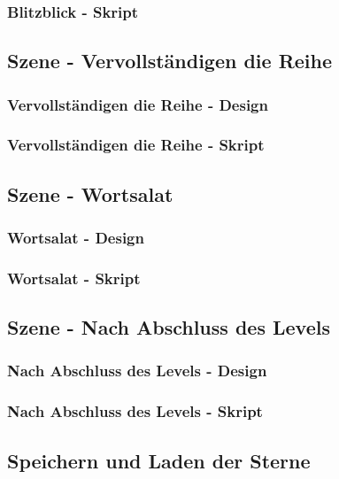 \subsubsection{Blitzblick - Skript}
\subsection{Szene - Vervollständigen die Reihe}
\subsubsection{Vervollständigen die Reihe - Design}
\subsubsection{Vervollständigen die Reihe - Skript}
\subsection{Szene - Wortsalat}
\subsubsection{Wortsalat - Design}
\subsubsection{Wortsalat - Skript}
\subsection{Szene - Nach Abschluss des Levels}
\subsubsection{Nach Abschluss des Levels - Design}
\subsubsection{Nach Abschluss des Levels - Skript}
\subsection{Speichern und Laden der Sterne}
